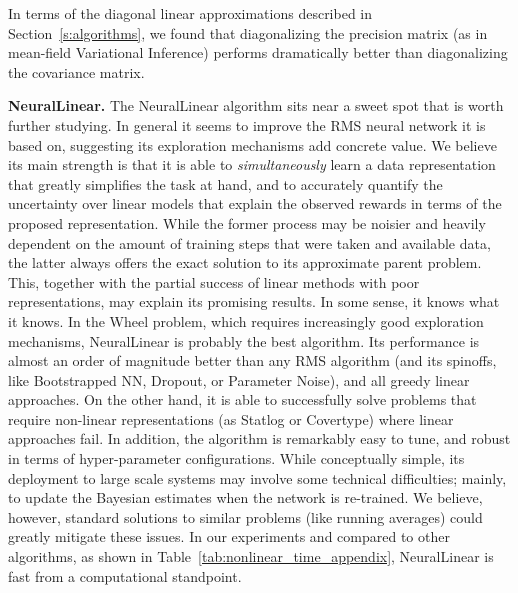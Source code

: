 \documentclass{article} \usepackage{iclr2018_conference,times}
\begin{document}
In terms of the diagonal linear approximations described in Section~\ref{s:algorithms}, we found that diagonalizing the precision matrix (as in mean-field Variational Inference) performs dramatically better than diagonalizing the covariance matrix.

\textbf{NeuralLinear.} The NeuralLinear algorithm sits near a sweet spot that is worth further studying. In general it seems to improve the RMS neural network it is based on, suggesting its exploration mechanisms add concrete value. We believe its main strength is that it is able to \emph{simultaneously} learn a data representation that greatly simplifies the task at hand, and to accurately quantify the uncertainty over linear models that explain the observed rewards in terms of the proposed representation. While the former process may be noisier and heavily dependent on the amount of training steps that were taken and available data, the latter always offers the exact solution to its approximate parent problem. This, together with the partial success of linear methods with poor representations, may explain its promising results. In some sense, it knows what it knows.
In the Wheel problem, which requires increasingly good exploration mechanisms, NeuralLinear is probably the best algorithm.
Its performance is almost an order of magnitude better than any RMS algorithm (and its spinoffs, like Bootstrapped NN, Dropout, or Parameter Noise), and all greedy linear approaches.
On the other hand, it is able to successfully solve problems that require non-linear representations (as Statlog or Covertype) where linear approaches fail. 
In addition, the algorithm is remarkably easy to tune, and robust in terms of hyper-parameter configurations. 
While conceptually simple, its deployment to large scale systems may involve some technical difficulties; mainly, to update the Bayesian estimates when the network is re-trained. We believe, however, standard solutions to similar problems (like running averages) could greatly mitigate these issues.
In our experiments and compared to other algorithms, as shown in Table~\ref{tab:nonlinear_time_appendix}, NeuralLinear is fast from a computational standpoint.
\end{document}
